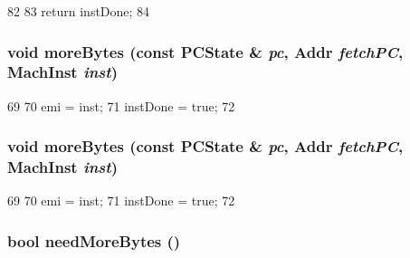 \begin{DoxyCode}
82     {
83         return instDone;
84     }
\end{DoxyCode}
\hypertarget{classMipsISA_1_1Decoder_a85a99c8dd9425508bee9a17836dbbd12}{
\subsubsection[{moreBytes}]{\setlength{\rightskip}{0pt plus 5cm}void moreBytes (const {\bf PCState} \& {\em pc}, \/  {\bf Addr} {\em fetchPC}, \/  {\bf MachInst} {\em inst})}}
\label{classMipsISA_1_1Decoder_a85a99c8dd9425508bee9a17836dbbd12}



\begin{DoxyCode}
69     {
70         emi = inst;
71         instDone = true;
72     }
\end{DoxyCode}
\hypertarget{classMipsISA_1_1Decoder_a85a99c8dd9425508bee9a17836dbbd12}{
\subsubsection[{moreBytes}]{\setlength{\rightskip}{0pt plus 5cm}void moreBytes (const {\bf PCState} \& {\em pc}, \/  {\bf Addr} {\em fetchPC}, \/  {\bf MachInst} {\em inst})}}
\label{classMipsISA_1_1Decoder_a85a99c8dd9425508bee9a17836dbbd12}



\begin{DoxyCode}
69     {
70         emi = inst;
71         instDone = true;
72     }
\end{DoxyCode}
\hypertarget{classMipsISA_1_1Decoder_a35631c47fc45b69ca30e6551f9f5d1d1}{
\subsubsection[{needMoreBytes}]{\setlength{\rightskip}{0pt plus 5cm}bool needMoreBytes ()}}
\label{classMipsISA_1_1Decoder_a35631c47fc45b69ca30e6551f9f5d1d1}



